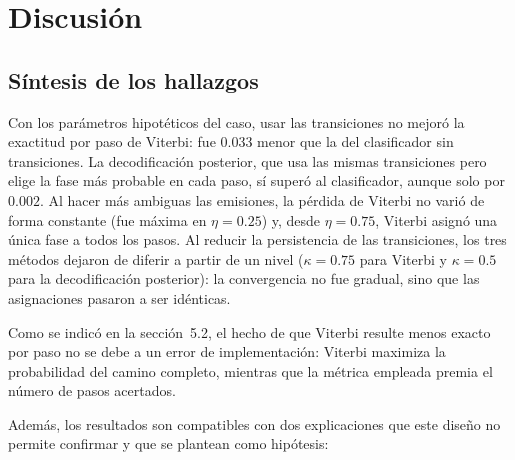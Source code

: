 \documentclass[11pt,a4paper]{article}
\begin{document}
\section{Discusión}

\subsection{Síntesis de los hallazgos}

Con los parámetros hipotéticos del caso, usar las transiciones no mejoró la
exactitud por paso de Viterbi: fue $0.033$ menor que la del clasificador sin
transiciones. La decodificación posterior, que usa las mismas transiciones pero
elige la fase más probable en cada paso, sí superó al clasificador, aunque solo
por $0.002$. Al hacer más ambiguas las emisiones, la pérdida de Viterbi no
varió de forma constante (fue máxima en $\eta=0.25$) y, desde $\eta=0.75$,
Viterbi asignó una única fase a todos los pasos. Al reducir la persistencia de
las transiciones, los tres métodos dejaron de diferir a partir de un nivel
($\kappa=0.75$ para Viterbi y $\kappa=0.5$ para la decodificación posterior):
la convergencia no fue gradual, sino que las asignaciones pasaron a ser
idénticas.

Como se indicó en la sección~5.2, el hecho de que Viterbi resulte menos exacto
por paso no se debe a un error de implementación: Viterbi maximiza la
probabilidad del camino completo, mientras que la métrica empleada premia el
número de pasos acertados.

Además, los resultados son compatibles con dos explicaciones que este diseño
no permite confirmar y que se plantean como hipótesis:
\end{document}
